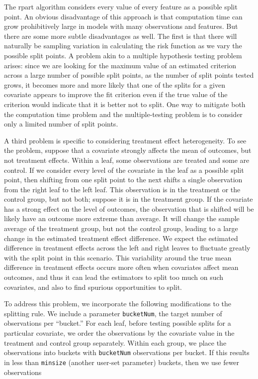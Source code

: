 \documentclass[11pt]{article}
\begin{document}
The rpart algorithm considers every value of every feature as a possible split point.
An obvious disadvantage of this approach is that computation time can grow prohibitively large in models with many observations
and features.  But there are some more subtle disadvantages as well. The first is that there will naturally be sampling variation
in calculating the risk function as we vary the possible split points. A problem akin to a multiple hypothesis testing problem arises:
since we are looking for the maximum value of an estimated criterion across a large number of possible split points,
as the number of split points tested grows, it becomes more and more likely that one of the splits for a given covariate appears to improve the fit criterion even if the true
value of the criterion would indicate that it is better not to split.  One way to mitigate both the computation time problem and
the multiple-testing problem is to consider only a limited number of split points. \par
A third problem is specific to considering treatment effect heterogeneity.  To see the problem, suppose that a covariate
strongly affects the mean of outcomes, but not treatment effects.  Within a leaf, some observations are treated and some
are control. If we consider every level of the covariate in the leaf as a possible split point, then shifting from one split point to the
next shifts a single observation from the right leaf to the left leaf.  This observation is in the treatment or the control group,
but not both; suppose it is in the treatment group.  If the covariate has a strong effect on the level of outcomes, the observation that is shifted will be likely have an
outcome more extreme than average. It will change the sample average of the treatment group, but not the control group, leading
to a large change in the estimated treatment effect difference.
We expect the estimated difference in treatment effects across the left and right leaves to fluctuate greatly with the split point in this scenario.  This
variability around the true mean difference in treatment effects occurs more often when covariates affect mean outcomes, and thus it
can lead the estimators to split too much on such covariates, and also to find spurious opportunities to split.\par
To address this problem, we incorporate the following modifications to the splitting rule.  We include a parameter \texttt{bucketNum}, 
the target number of observations per ``bucket.'' For each leaf, before testing possible
splits for a particular covariate, we order the observations by the covariate value in the treatment and control group separately.  Within each group, we place the observations into buckets with \texttt{bucketNum} observations per bucket.  If this results in less than \texttt{minsize} (another user-set parameter) buckets, then we use fewer observations
\end{document}

